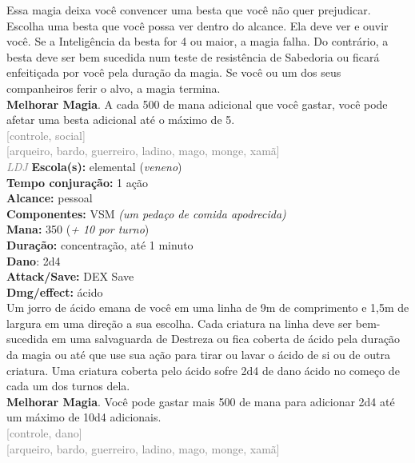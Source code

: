 \documentclass{RPG_Adventure}[2021/10/20]
\begin{document}
{\normalsize Essa magia deixa você convencer uma besta que você não quer prejudicar. Escolha uma besta que você possa ver dentro do alcance. Ela deve ver e ouvir você. Se a Inteligência da besta for 4 ou maior, a magia falha. Do contrário, a besta deve ser bem sucedida num teste de resistência de Sabedoria ou ficará enfeitiçada por você pela duração da magia. Se você ou um dos seus companheiros ferir o alvo, a magia termina.\\\t \textbf{Melhorar Magia}. A cada 500 de mana adicional que você gastar, você pode afetar uma besta adicional até o máximo de 5.\\}
{\scriptsize \textcolor{gray}{[controle, social]\\}}
{\scriptsize \textcolor{gray}{[arqueiro, bardo, guerreiro, ladino, mago, monge, xamã]\\}}
{\tiny \textcolor{gray}{\textit{LDJ}}}\jump{}
{\small \t \textbf{Escola(s):} elemental (\textit{veneno})\\\t \textbf{Tempo conjuração:} 1 ação\\\t \textbf{Alcance:} pessoal\\\t \textbf{Componentes:} VSM \textit{(um pedaço de comida apodrecida)}\\\t \textbf{Mana:} 350 (\textit{+ 10 por turno})\\\t \textbf{Duração:} concentração, até 1 minuto\\\t \textbf{Dano}: 2d4\\\t \textbf{Attack/Save:} DEX Save\\\t \textbf{Dmg/effect:} ácido\\}
{\normalsize Um jorro de ácido emana de você em uma linha de 9m de comprimento e 1,5m de largura em uma direção a sua escolha. Cada criatura na linha deve ser bem-sucedida em uma salvaguarda de Destreza ou fica coberta de ácido pela duração da magia ou até que use sua ação para tirar ou lavar o ácido de si ou de outra criatura. Uma criatura coberta pelo ácido sofre 2d4 de dano ácido no começo de cada um dos turnos dela.\\\t \textbf{Melhorar Magia}. Você pode gastar mais 500 de mana para adicionar 2d4 até um máximo de 10d4 adicionais.\\}
{\scriptsize \textcolor{gray}{[controle, dano]\\}}
{\scriptsize \textcolor{gray}{[arqueiro, bardo, guerreiro, ladino, mago, monge, xamã]\\}}
\end{document}
